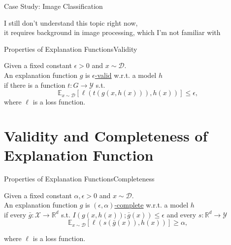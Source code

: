 \documentclass[10pt, aspectratio=169]{beamer}
\newcommand{\R}{\mathbb{R}}
\begin{document}
	\begin{frame}{Case Study: Image Classification}
		\begin{center}
			I still don't understand this topic right now,\\ it requires background in image processing, which I'm not familiar with
		\end{center}
	\end{frame}
	
	\begin{frame}[t]{Properties of Explanation Functions}{Validity}
		\begin{definition}
			Given a fixed constant $\epsilon>0$ and $x\sim \mathcal{D}$.\\
			An explanation function $g$ is \underline{$\epsilon$-valid} w.r.t. a model $h$\\
			if there is a function $t:G\to\mathcal{Y}$ s.t.
			$$
			\mathbb{E}_{x\sim\mathcal{D}}\left[ \ell\left(t\left(g\left(x,h\left(x\right)\right)\right),h\left(x\right)\right) \right]\leqslant\epsilon,
			$$
			where $\ell$ is a loss function.
		\end{definition}
	\end{frame}
	
	\section{Validity and Completeness of Explanation Function}
	
	\begin{frame}[t]{Properties of Explanation Functions}{Completeness}
		\begin{definition}
			Given a fixed constant $\alpha,\epsilon>0$ and $x\sim \mathcal{D}$.\\
			An explanation function $g$ is \underline{$(\epsilon,\alpha)$-complete} w.r.t. a model $h$\\
			if every $\bar{g}:\mathcal{X}\to\R^d$ s.t. $I(g(x,h(x));\bar{g}(x))\leqslant\epsilon$ and every $s:\R^d\to\mathcal{Y}$
			$$
				\mathbb{E}_{x\sim\mathcal{D}}\left[ \ell
					\left(
						s(\bar{g}(x)), h(x)
					\right)
				\right]\geqslant\alpha,
			$$
			
			where $\ell$ is a loss function.
		\end{definition}
	\end{frame}
	
\end{document}
